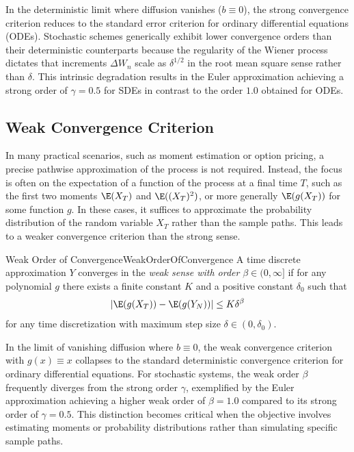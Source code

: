 \begin{xtip}
In the deterministic limit where diffusion vanishes ($b \equiv 0$), the strong convergence criterion reduces to the standard error criterion for ordinary differential equations (ODEs). Stochastic schemes generically exhibit lower convergence orders than their deterministic counterparts because the regularity of the Wiener process dictates that increments $\Delta W_n$ scale as $\delta^{1/2}$ in the root mean square sense rather than $\delta$. This intrinsic degradation results in the Euler approximation achieving a strong order of $\gamma = 0.5$ for SDEs in contrast to the order $1.0$ obtained for ODEs.
\end{xtip}

\subsection{Weak Convergence Criterion}
In many practical scenarios, such as moment estimation or option pricing, a precise pathwise approximation of the \Ito{} process is not required. Instead, the focus is often on the expectation of a function of the process at a final time $T$, such as the first two moments $\E(X_T)$ and $\E((X_T)^2)$, or more generally $\E(g(X_T))$ for some function $g$. In these cases, it suffices to approximate the probability distribution of the random variable $X_T$ rather than the sample paths. This leads to a weaker convergence criterion than the strong sense.

\begin{defn}{Weak Order of Convergence}{WeakOrderOfConvergence}
A time discrete approximation $Y$ converges in the \textit{weak sense with order} $\beta \in (0, \infty]$ if for any polynomial $g$ there exists a finite constant $K$ and a positive constant $\delta_0$ such that
\begin{equation}
    |\E(g(X_T)) - \E(g(Y_N))| \le K \delta^\beta
    \label{eq:WeakConvergenceOrder}
\end{equation}
for any time discretization with maximum step size $\delta \in (0, \delta_0)$.
\end{defn}

\begin{xtip}
In the limit of vanishing diffusion where $b \equiv 0$, the weak convergence criterion with $g(x) \equiv x$ collapses to the standard deterministic convergence criterion for ordinary differential equations. For stochastic systems, the weak order $\beta$ frequently diverges from the strong order $\gamma$, exemplified by the Euler approximation achieving a higher weak order of $\beta = 1.0$ compared to its strong order of $\gamma = 0.5$. This distinction becomes critical when the objective involves estimating moments or probability distributions rather than simulating specific sample paths.
\end{xtip}

